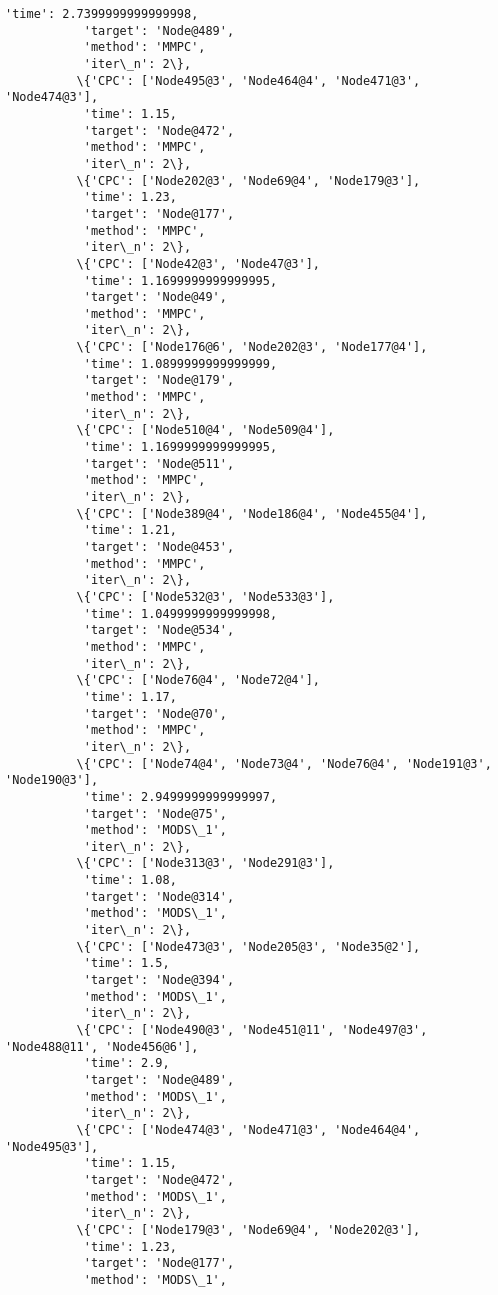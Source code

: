 \documentclass[11pt]{article}
\begin{document}
\begin{Verbatim}[commandchars=\\\{\}]
           'time': 2.7399999999999998,
           'target': 'Node@489',
           'method': 'MMPC',
           'iter\_n': 2\},
          \{'CPC': ['Node495@3', 'Node464@4', 'Node471@3', 'Node474@3'],
           'time': 1.15,
           'target': 'Node@472',
           'method': 'MMPC',
           'iter\_n': 2\},
          \{'CPC': ['Node202@3', 'Node69@4', 'Node179@3'],
           'time': 1.23,
           'target': 'Node@177',
           'method': 'MMPC',
           'iter\_n': 2\},
          \{'CPC': ['Node42@3', 'Node47@3'],
           'time': 1.1699999999999995,
           'target': 'Node@49',
           'method': 'MMPC',
           'iter\_n': 2\},
          \{'CPC': ['Node176@6', 'Node202@3', 'Node177@4'],
           'time': 1.0899999999999999,
           'target': 'Node@179',
           'method': 'MMPC',
           'iter\_n': 2\},
          \{'CPC': ['Node510@4', 'Node509@4'],
           'time': 1.1699999999999995,
           'target': 'Node@511',
           'method': 'MMPC',
           'iter\_n': 2\},
          \{'CPC': ['Node389@4', 'Node186@4', 'Node455@4'],
           'time': 1.21,
           'target': 'Node@453',
           'method': 'MMPC',
           'iter\_n': 2\},
          \{'CPC': ['Node532@3', 'Node533@3'],
           'time': 1.0499999999999998,
           'target': 'Node@534',
           'method': 'MMPC',
           'iter\_n': 2\},
          \{'CPC': ['Node76@4', 'Node72@4'],
           'time': 1.17,
           'target': 'Node@70',
           'method': 'MMPC',
           'iter\_n': 2\},
          \{'CPC': ['Node74@4', 'Node73@4', 'Node76@4', 'Node191@3', 'Node190@3'],
           'time': 2.9499999999999997,
           'target': 'Node@75',
           'method': 'MODS\_1',
           'iter\_n': 2\},
          \{'CPC': ['Node313@3', 'Node291@3'],
           'time': 1.08,
           'target': 'Node@314',
           'method': 'MODS\_1',
           'iter\_n': 2\},
          \{'CPC': ['Node473@3', 'Node205@3', 'Node35@2'],
           'time': 1.5,
           'target': 'Node@394',
           'method': 'MODS\_1',
           'iter\_n': 2\},
          \{'CPC': ['Node490@3', 'Node451@11', 'Node497@3', 'Node488@11', 'Node456@6'],
           'time': 2.9,
           'target': 'Node@489',
           'method': 'MODS\_1',
           'iter\_n': 2\},
          \{'CPC': ['Node474@3', 'Node471@3', 'Node464@4', 'Node495@3'],
           'time': 1.15,
           'target': 'Node@472',
           'method': 'MODS\_1',
           'iter\_n': 2\},
          \{'CPC': ['Node179@3', 'Node69@4', 'Node202@3'],
           'time': 1.23,
           'target': 'Node@177',
           'method': 'MODS\_1',

\end{Verbatim}
\end{document}
